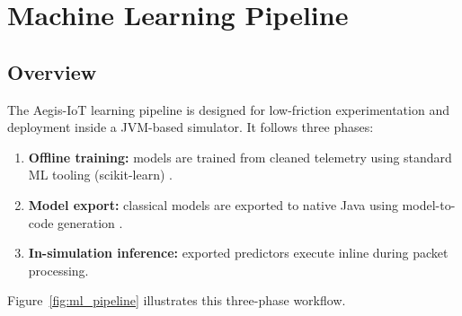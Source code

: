 \chapter{Machine Learning Pipeline}

\section{Overview}

The Aegis-IoT learning pipeline is designed for low-friction experimentation and deployment inside a JVM-based simulator. It follows three phases:
\begin{enumerate}
    \item \textbf{Offline training:} models are trained from cleaned telemetry using standard ML tooling (scikit-learn) \cite{sklearn}.
    \item \textbf{Model export:} classical models are exported to native Java using model-to-code generation \cite{m2cgen}.
    \item \textbf{In-simulation inference:} exported predictors execute inline during packet processing.
\end{enumerate}

Figure~\ref{fig:ml_pipeline} illustrates this three-phase workflow.

